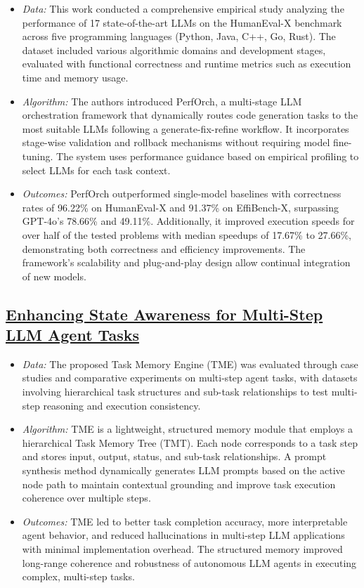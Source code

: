 \documentclass[12pt,a4paper]{article}
\begin{document}
\begin{itemize}[leftmargin=1.5em]
    \item \textit{Data:} This work conducted a comprehensive empirical study analyzing the performance of 17 
    state-of-the-art LLMs on the HumanEval-X benchmark across five programming languages (Python, Java, C++, Go, Rust). 
    The dataset included various algorithmic domains and development stages, evaluated with functional correctness and 
    runtime metrics such as execution time and memory usage.
    \item \textit{Algorithm:} The authors introduced PerfOrch, a multi-stage LLM orchestration framework that 
    dynamically routes code generation tasks to the most suitable LLMs following a generate-fix-refine workflow. It 
    incorporates stage-wise validation and rollback mechanisms without requiring model fine-tuning. The system uses 
    performance guidance based on empirical profiling to select LLMs for each task context.
    \item \textit{Outcomes:} PerfOrch outperformed single-model baselines with correctness rates of 96.22\% on 
    HumanEval-X and 91.37\% on EffiBench-X, surpassing GPT-4o’s 78.66\% and 49.11\%. Additionally, it improved execution 
    speeds for over half of the tested problems with median speedups of 17.67\% to 27.66\%, demonstrating both 
    correctness and efficiency improvements. The framework’s scalability and plug-and-play design allow continual 
    integration of new models.
\end{itemize}

\subsection{\href{https://arxiv.org/abs/2504.08525}{Enhancing State Awareness for Multi-Step LLM Agent Tasks}}

\begin{itemize}[leftmargin=1.5em]
    \item \textit{Data:} The proposed Task Memory Engine (TME) was evaluated through case studies and comparative 
    experiments on multi-step agent tasks, with datasets involving hierarchical task structures and sub-task 
    relationships to test multi-step reasoning and execution consistency.
    \item \textit{Algorithm:} TME is a lightweight, structured memory module that employs a hierarchical Task Memory 
    Tree (TMT). Each node corresponds to a task step and stores input, output, status, and sub-task relationships. A 
    prompt synthesis method dynamically generates LLM prompts based on the active node path to maintain contextual 
    grounding and improve task execution coherence over multiple steps.
    \item \textit{Outcomes:} TME led to better task completion accuracy, more interpretable agent behavior, and reduced 
    hallucinations in multi-step LLM applications with minimal implementation overhead. The structured memory improved 
    long-range coherence and robustness of autonomous LLM agents in executing complex, multi-step tasks.
\end{itemize}
\end{document}
